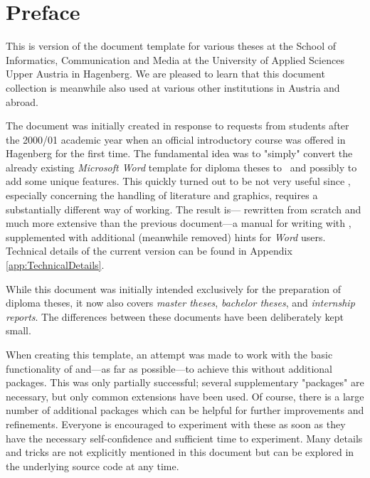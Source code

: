 \chapter{Preface} %

This is version \textbf{\hgbDate} of the \latex document template for various
theses at the School of Informatics, Communication and Media at the University
of Applied Sciences Upper Austria in Hagenberg. We are pleased to learn that this
document collection is meanwhile also used at various other institutions in Austria
and abroad.

The document was initially created in response to requests from students after
the 2000/01 academic year when an official \latex introductory course was
offered in Hagenberg for the first time. The fundamental idea was to
"simply" convert the already existing \emph{Microsoft Word} template for
diploma theses to \latex\ and possibly to add some unique features. This quickly
turned out to be not very useful since \latex, especially concerning the
handling of literature and graphics, requires a substantially different way of
working. The result is--- rewritten from scratch and much more extensive than
the previous document---a manual for writing with \latex, supplemented with
additional (meanwhile removed) hints for \emph{Word} users. Technical details
of the current version can be found in Appendix \ref{app:TechnicalDetails}.

While this document was initially intended exclusively for the preparation
of diploma theses, it now also covers \emph{master theses},
\emph{bachelor theses}, and \emph{internship reports}. The differences between
these documents have been deliberately kept small.


When creating this template, an attempt was made to work with the basic
functionality of \latex and---as far as possible---to achieve this without
additional packages. This was only partially successful; several supplementary
"packages" are necessary, but only common extensions have been used. Of course,
there is a large number of additional packages which can be helpful for further
improvements and refinements. Everyone is encouraged to experiment with these as
soon as they have the necessary self-confidence and sufficient time to
experiment. Many details and tricks are not explicitly mentioned in this
document but can be explored in the underlying source code at any time.

